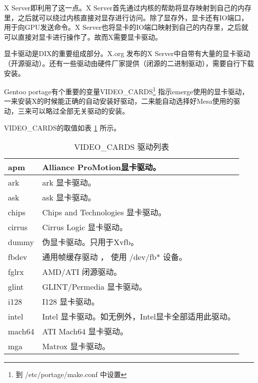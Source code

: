X Server即利用了这一点。X Server首先通过内核的帮助将显存映射到自己的内存里，之后就可以绕过内核直接对显存进行访问。除了显存外，显卡还有IO端口，用于向GPU发送命令。X Server也将显卡的IO端口映射到自己的内存里，之后就可以直接对显卡进行操作了。故而X需要显卡驱动。

显卡驱动是DIX的重要组成部分。X.org 发布的X Server中自带有大量的显卡驱动（开源驱动）。还有一些驱动由硬件厂家提供（闭源的二进制驱动），需要自行下载安装。

Gentoo portage有个重要的变量VIDEO\_CARDS\footnote{到 /etc/portage/make.conf 中设置} 指示emerge使用的显卡驱动，一来安装X的时候能正确的自动安装好驱动，二来能自动选择好Mesa使用的驱动，三来可以略过全部无关驱动的安装。

VIDEO\_CARDS的取值如表 \ref{table:videocards} 所示。

\begin{longtable}{|l|p{}|}
\caption{VIDEO\_CARDS 驱动列表}\label{table:videocards}\\
\hline
apm & Alliance ProMotion显卡驱动。 \\\hline
ark & ark 显卡驱动。 \\\hline
ask & ask 显卡驱动。 \\\hline
chips & Chips and Technologies 显卡驱动。 \\\hline
cirrus & Cirrus Logic 显卡驱动。\\\hline
dummy & 伪显卡驱动。只用于Xvfb。 \\\hline
fbdev & 通用帧缓存驱动 ， 使用 /dev/fb* 设备。 \\\hline
fglrx & AMD/ATI 闭源驱动。  \\\hline
glint & GLINT/Permedia 显卡驱动。 \\\hline
i128 & I128 显卡驱动。\\\hline
intel & Intel 显卡驱动。如无例外，Intel显卡全部适用此驱动。\\\hline
mach64 & ATI Mach64 显卡驱动。 \\\hline
mga & Matrox 显卡驱动。 \\\hline

\end{longtable}
